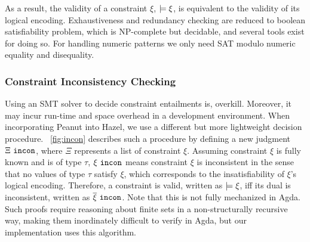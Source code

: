 As a result, the validity of a constraint $\xi$, $\models \xi$, is equivalent to the validity of its logical encoding. Exhaustiveness and redundancy checking are reduced to boolean satisfiability problem, which is NP-complete but decidable, and several tools exist for doing so. For handling numeric patterns we only need SAT modulo numeric equality and disequality.

\subsubsection{Constraint Inconsistency Checking}\label{sec:incon}

Using an SMT solver to decide constraint entailments is, overkill. Moreover, it may incur run-time and space overhead in a  development environment. When incorporating Peanut into Hazel, we use a different but more lightweight decision procedure. \figurename~\ref{fig:incon} describes such a procedure by defining a new judgment $\Xi ~\mathtt{incon}$, where $\Xi$ represents a list of constraint $\xi$. Assuming constraint $\xi$ is fully known and is of type $\tau$, $\xi ~\mathtt{incon}$ means constraint $\xi$ is inconsistent in the sense that no values of type $\tau$ satisfy $\xi$, which corresponds to the insatisfiability of $\xi$'s logical encoding. Therefore, a constraint is valid, written as $\models \xi$, iff its dual is inconsistent, written as $\overline{\xi} ~\mathtt{incon}$. Note that this is not fully mechanized in Agda. Such proofs require reasoning about finite sets in a non-structurally recursive way, making them inordinately difficult to verify in Agda, but our implementation uses this algorithm.




%
